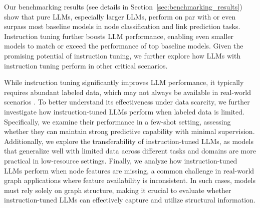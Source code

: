 Our benchmarking results (see details in Section~\ref{sec:benchmarking_results}) show that pure LLMs, especially larger LLMs, perform on par with or even surpass most baseline models in node classification and link prediction tasks. Instruction tuning further boosts LLM performance, enabling even smaller models to match or exceed the performance of top baseline models. Given the promising potential of instruction tuning, we further explore how LLMs with instruction tuning perform in other critical scenarios. 

While instruction tuning significantly improves LLM performance, it typically requires abundant labeled data, which may not always be available in real-world scenarios \cite{xia2024opengraph}. To better understand its effectiveness under data scarcity, we further investigate how instruction-tuned LLMs perform when labeled data is limited. Specifically, we examine their performance in a few-shot setting, assessing whether they can maintain strong predictive capability with minimal supervision. Additionally, we explore the transferability of instruction-tuned LLMs, as models that generalize well with limited data across different tasks and domains are more practical in low-resource settings.  Finally, we analyze how instruction-tuned LLMs perform when node features are missing, a common challenge in real-world graph applications where feature availability is inconsistent. In such cases, models must rely solely on graph structure, making it crucial to evaluate whether instruction-tuned LLMs can effectively capture and utilize structural information.



